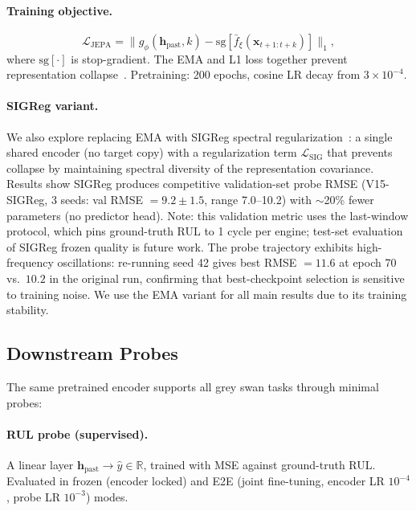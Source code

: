 \documentclass{article}
\newcommand{\R}{\mathbb{R}}
\newcommand{\x}{\mathbf{x}}
\newcommand{\h}{\mathbf{h}}
\newcommand{\loss}{\mathcal{L}}
\newcommand{\predictor}{g_\phi}
\newcommand{\target}{\bar{f}_\xi}
\begin{document}
\paragraph{Training objective.}
\begin{equation}
  \loss_\text{JEPA} = \| \predictor(\h_\text{past}, k) - \text{sg}[\target(\x_{t+1:t+k})] \|_1,
  \label{eq:jepa_loss}
\end{equation}
where $\text{sg}[\cdot]$ is stop-gradient. The EMA and L1 loss together prevent representation collapse~\citep{grill2020byol}. Pretraining: 200 epochs, cosine LR decay from $3 \times 10^{-4}$.

\paragraph{SIGReg variant.} We also explore replacing EMA with SIGReg spectral regularization~\citep{balestriero2025lejepa}: a single shared encoder (no target copy) with a regularization term $\loss_\text{SIG}$ that prevents collapse by maintaining spectral diversity of the representation covariance. Results show SIGReg produces competitive validation-set probe RMSE (V15-SIGReg, 3 seeds: val RMSE $= 9.2 \pm 1.5$, range 7.0--10.2) with $\sim$20\% fewer parameters (no predictor head). Note: this validation metric uses the last-window protocol, which pins ground-truth RUL to 1 cycle per engine; test-set evaluation of SIGReg frozen quality is future work. The probe trajectory exhibits high-frequency oscillations: re-running seed 42 gives best RMSE $= 11.6$ at epoch 70 vs.\ $10.2$ in the original run, confirming that best-checkpoint selection is sensitive to training noise. We use the EMA variant for all main results due to its training stability.

\subsection{Downstream Probes}
\label{sec:probes}

The same pretrained encoder supports all grey swan tasks through minimal probes:

\paragraph{RUL probe (supervised).} A linear layer $\h_\text{past} \to \hat{y} \in \R$, trained with MSE against ground-truth RUL. Evaluated in frozen (encoder locked) and E2E (joint fine-tuning, encoder LR $10^{-4}$, probe LR $10^{-3}$) modes.
\end{document}
